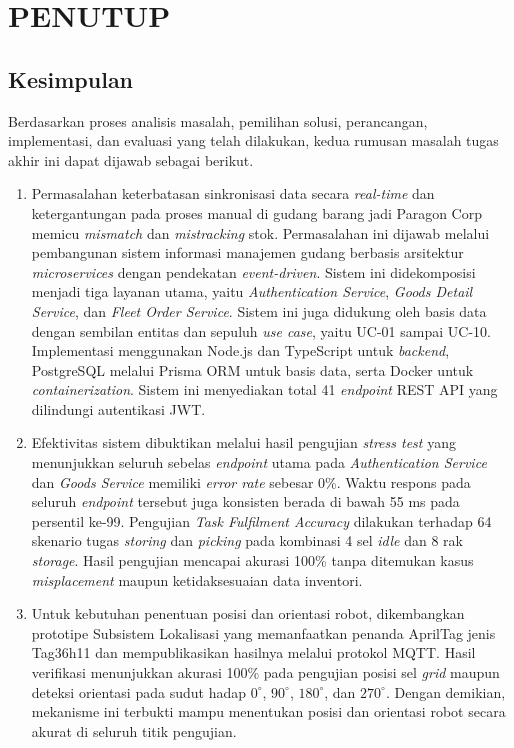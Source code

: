 \cleardoublepage
\chapter{PENUTUP}
\label{chap:penutup}

\section{Kesimpulan}
Berdasarkan proses analisis masalah, pemilihan solusi, perancangan, implementasi, dan evaluasi yang telah dilakukan, kedua rumusan masalah tugas akhir ini dapat dijawab sebagai berikut.

\begin{enumerate}
\item Permasalahan keterbatasan sinkronisasi data secara \textit{real-time} dan ketergantungan pada proses manual di gudang barang jadi Paragon Corp memicu \textit{mismatch} dan \textit{mistracking} stok. Permasalahan ini dijawab melalui pembangunan sistem informasi manajemen gudang berbasis arsitektur \textit{microservices} dengan pendekatan \textit{event-driven}. Sistem ini didekomposisi menjadi tiga layanan utama, yaitu \textit{Authentication Service}, \textit{Goods Detail Service}, dan \textit{Fleet Order Service}. Sistem ini juga didukung oleh basis data dengan sembilan entitas dan sepuluh \textit{use case}, yaitu UC-01 sampai UC-10. Implementasi menggunakan Node.js dan TypeScript untuk \textit{backend}, PostgreSQL melalui Prisma ORM untuk basis data, serta Docker untuk \textit{containerization}. Sistem ini menyediakan total 41 \textit{endpoint} REST API yang dilindungi autentikasi JWT.
\item Efektivitas sistem dibuktikan melalui hasil pengujian \textit{stress test} yang menunjukkan seluruh sebelas \textit{endpoint} utama pada \textit{Authentication Service} dan \textit{Goods Service} memiliki \textit{error rate} sebesar 0\%. Waktu respons pada seluruh \textit{endpoint} tersebut juga konsisten berada di bawah 55 ms pada persentil ke-99. Pengujian \textit{Task Fulfilment Accuracy} dilakukan terhadap 64 skenario tugas \textit{storing} dan \textit{picking} pada kombinasi 4 sel \textit{idle} dan 8 rak \textit{storage}. Hasil pengujian mencapai akurasi 100\% tanpa ditemukan kasus \textit{misplacement} maupun ketidaksesuaian data inventori.
\item Untuk kebutuhan penentuan posisi dan orientasi robot, dikembangkan prototipe Subsistem Lokalisasi yang memanfaatkan penanda AprilTag jenis Tag36h11 dan mempublikasikan hasilnya melalui protokol MQTT. Hasil verifikasi menunjukkan akurasi 100\% pada pengujian posisi sel \textit{grid} maupun deteksi orientasi pada sudut hadap $0^\circ$, $90^\circ$, $180^\circ$, dan $270^\circ$. Dengan demikian, mekanisme ini terbukti mampu menentukan posisi dan orientasi robot secara akurat di seluruh titik pengujian.
\end{enumerate}

